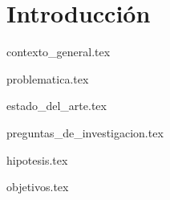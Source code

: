 \section{Introducción}

{contexto_general.tex}

{problematica.tex}

{estado_del_arte.tex}

{preguntas_de_investigacion.tex}

{hipotesis.tex}

{objetivos.tex}
